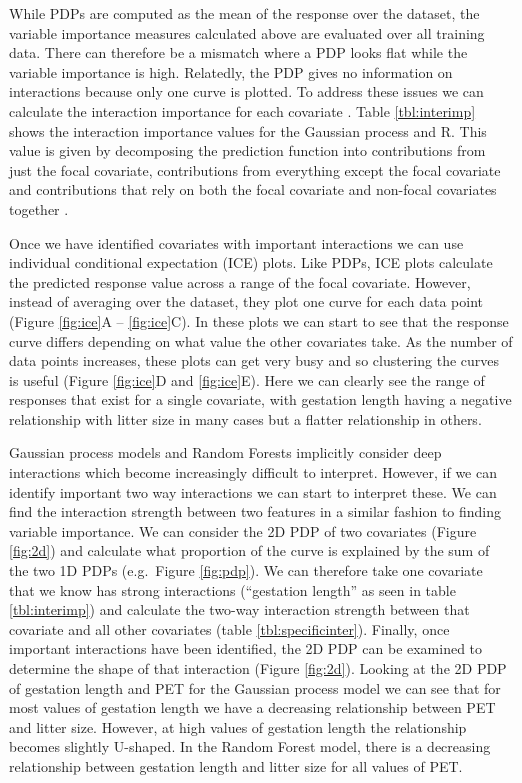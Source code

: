\documentclass[12pt]{article}
\begin{document}
While PDPs are computed as the mean of the response over the dataset, the variable importance measures calculated above are evaluated over all training data.
There can therefore be a mismatch where a PDP looks flat while the variable importance is high.
Relatedly, the PDP gives no information on interactions because only one curve is plotted.
To address these issues we can calculate the interaction importance for each covariate .
Table \ref{tbl:interimp} shows the interaction importance values for the Gaussian process and R.
This value is given by decomposing the prediction function into contributions from just the focal covariate, contributions from everything except the focal covariate and contributions that rely on both the focal covariate and non-focal covariates together \citep{friedman2008predictive}.


Once we have identified covariates with important interactions we can use individual conditional expectation (ICE) plots.
Like PDPs, ICE plots calculate the predicted response value across a range of the focal covariate.
However, instead of averaging over the dataset, they plot one curve for each data point (Figure \ref{fig:ice}A -- \ref{fig:ice}C).
In these plots we can start to see that the response curve differs depending on what value the other covariates take.
As the number of data points increases, these plots can get very busy and so clustering the curves is useful (Figure \ref{fig:ice}D and \ref{fig:ice}E).
Here we can clearly see the range of responses that exist for a single covariate, with gestation length having a negative relationship with litter size in many cases but a flatter relationship in others.

Gaussian process models and Random Forests implicitly consider deep interactions which become increasingly difficult to interpret.
However, if we can identify important two way interactions we can start to interpret these.
We can find the interaction strength between two features in a similar fashion to finding variable importance.
We can consider the 2D PDP of two covariates (Figure \ref{fig:2d}) and calculate what proportion of the curve is explained by the sum of the two 1D PDPs (e.g.~Figure \ref{fig:pdp}).
We can therefore take one covariate that we know has strong interactions (``gestation length'' as seen in table \ref{tbl:interimp}) and calculate the two-way interaction strength between that covariate and all other covariates (table \ref{tbl:specificinter}).
Finally, once important interactions have been identified, the 2D PDP can be examined to determine the shape of that interaction (Figure \ref{fig:2d}).
Looking at the 2D PDP of gestation length and PET for the Gaussian process model we can see that for most values of gestation length we have a decreasing relationship between PET and litter size.
However, at high values of gestation length the relationship becomes slightly U-shaped.
In the Random Forest model, there is a decreasing relationship between gestation length and litter size for all values of PET.
\end{document}
